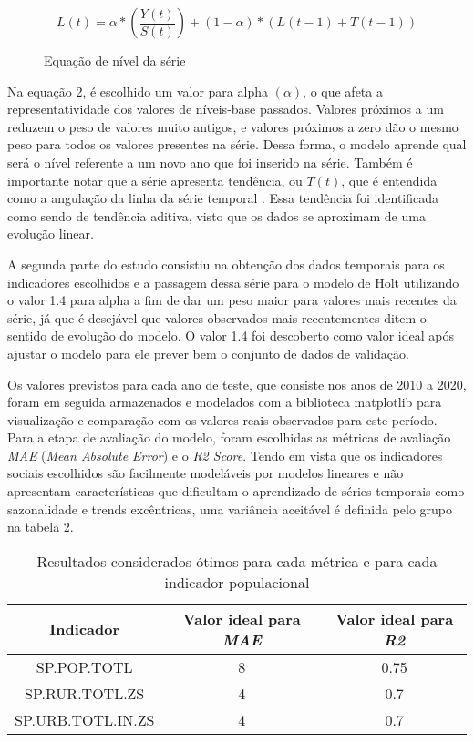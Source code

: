 \begin{figure}[h]
    \centering
    \begin{equation}
        L(t) = \alpha * (\frac{Y(t)}{S(t)}) + (1 - \alpha) * (L(t-1) + T(t-1))
    \end{equation}
    \caption{Equação de nível da série}
\end{figure}

Na equação 2, é escolhido um valor para alpha $(\alpha)$, o que afeta a representatividade dos 
valores de níveis-base passados. Valores próximos a um reduzem o peso de valores muito antigos, 
e valores próximos a zero dão o mesmo peso para todos os valores presentes na série. 
Dessa forma, o modelo aprende qual será o nível referente a um novo ano que foi inserido 
na série. Também é importante notar que a série apresenta tendência, ou $T(t)$, que é entendida 
como a angulação da linha da série temporal \cite{WIENER:8}. Essa tendência foi identificada 
como sendo de tendência aditiva, visto que os dados se aproximam de uma evolução linear.

A segunda parte do estudo consistiu na obtenção dos dados temporais para os indicadores 
escolhidos e a passagem dessa série para o modelo de Holt utilizando o valor 1.4 para 
alpha a fim de dar um peso maior para valores mais recentes da série, já que é desejável 
que valores observados mais recentementes ditem o sentido de evolução do modelo. 
O valor 1.4 foi descoberto como valor ideal após ajustar o modelo para ele prever 
bem o conjunto de dados de validação.

Os valores previstos para cada ano de teste, que consiste nos anos de 2010 a 2020, 
foram em seguida armazenados e modelados com a biblioteca matplotlib para visualização 
e comparação com os valores reais observados para este período. Para a etapa de avaliação 
do modelo, foram escolhidas as métricas de avaliação \emph{MAE} (\emph{Mean Absolute Error}) e o \emph{R2 Score}. 
Tendo em vista que os indicadores sociais escolhidos são facilmente modeláveis por modelos lineares 
e não apresentam características que dificultam o aprendizado de séries temporais como sazonalidade 
e trends excêntricas, uma variância aceitável é definida pelo grupo na tabela 2.

\begin{table}[h]
    \centering
    \begin{tabular}{|c|c|c|}
        \hline
        Indicador & Valor ideal para \emph{MAE} & Valor ideal para \emph{R2} \\
        \hline
        SP.POP.TOTL & 8 & 0.75 \\ 
        \hline
        SP.RUR.TOTL.ZS & 4 & 0.7 \\
        \hline
        SP.URB.TOTL.IN.ZS & 4 & 0.7 \\
        \hline
    \end{tabular}
    \caption{Resultados considerados ótimos para cada métrica e para cada indicador populacional}
\end{table}